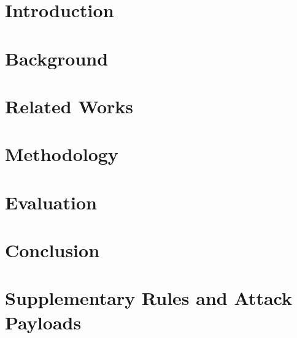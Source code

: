 \documentclass[12pt]{report}
\begin{document}

\setcounter{page}{1}
\chapter{Introduction} \label{introduction}


\chapter{Background} \label{Background}


\chapter{Related Works} \label{relate_work}


\chapter{Methodology} \label{methodology}


\chapter{Evaluation} \label{experimental_result}


\chapter{Conclusion} \label{conclusion}


\newpage

\cleardoublepage
{}
{}

\newpage

%
\appendix
\chapter{Supplementary Rules and Attack Payloads}
 \label{appendix}

\clearpage
\thispagestyle{empty}
\null
\end{document}
